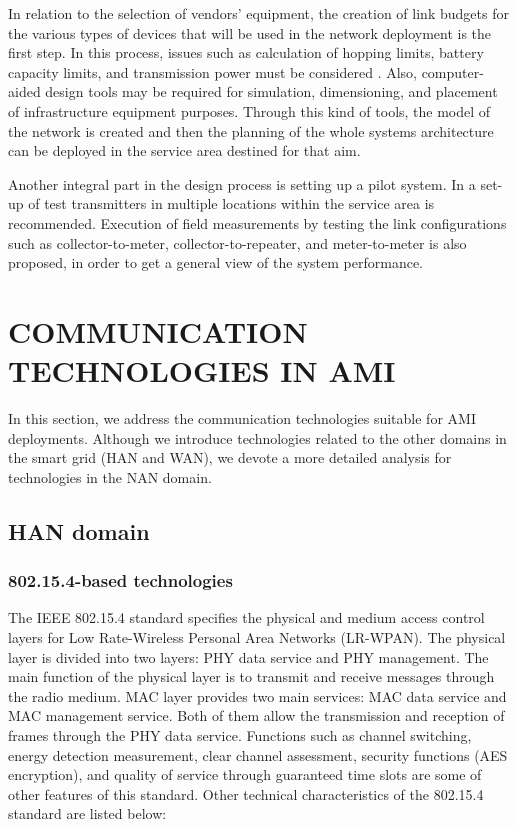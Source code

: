 \documentclass[10pt,twocolumn,twoside,submit]{JCNtran}
\begin{document}
In relation to the selection of vendors' equipment, the creation of link budgets for the various types of devices that will be used in the network deployment is the first step. In this process, issues such as calculation of hopping limits, battery capacity limits, and transmission power must be considered \cite{Leon2011}. Also, computer-aided design tools may be required for simulation, dimensioning, and placement of infrastructure equipment purposes.  Through this kind of tools, the model of the network is created and then the planning of the whole systems architecture can be deployed in the service area destined for that aim.

Another integral part in the design process is setting up a pilot system. In \cite{Leon2011}  a set-up of test transmitters in multiple locations within the service area is recommended. Execution of field measurements by testing the link configurations such as collector-to-meter, collector-to-repeater, and meter-to-meter is also proposed, in order to get a general view of the system performance.  

\vspace{10pt}
\section{\uppercase{Communication Technologies in AMI}}
\label{sec:technologies}

In this section, we address the communication technologies suitable for AMI deployments. Although we introduce technologies related to the other domains in the smart grid (HAN and WAN), we devote a more detailed analysis for technologies in the NAN domain. 

\subsection{HAN domain}

\subsubsection{802.15.4-based technologies}\label{tech::802154}

The IEEE 802.15.4 standard specifies the physical and medium access control layers for Low Rate-Wireless Personal Area Networks (LR-WPAN). The physical layer is divided into two layers: PHY data service and PHY management. The main function of the physical  layer is to transmit and receive messages through the radio medium. MAC layer provides two main services: MAC data service and MAC management service. Both of them allow the transmission and reception of frames through the PHY data service. Functions such as channel switching, energy detection measurement, clear channel assessment, security functions (AES encryption), and quality of service through guaranteed time slots are some of other features of this standard. Other technical characteristics of the 802.15.4 standard are listed below:
\end{document}

